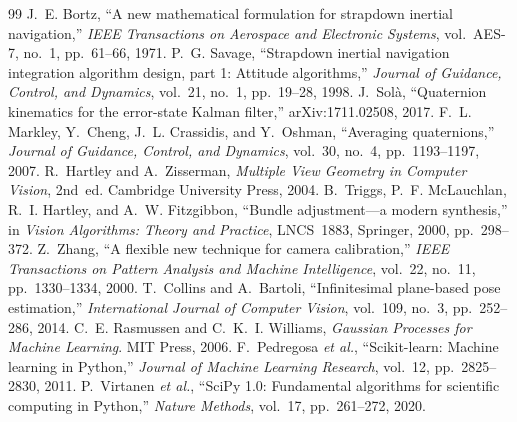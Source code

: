 \documentclass[11pt,a4paper]{article}
\begin{document}
\begin{thebibliography}{99}\small
{} J.~E. Bortz, ``A new mathematical formulation for strapdown inertial
navigation,'' \emph{IEEE Transactions on Aerospace and Electronic Systems}, vol.~AES-7, no.~1,
pp.~61--66, 1971.
 P.~G. Savage, ``Strapdown inertial navigation integration algorithm design,
part 1: Attitude algorithms,'' \emph{Journal of Guidance, Control, and Dynamics}, vol.~21, no.~1,
pp.~19--28, 1998.
 J.~Sol\`a, ``Quaternion kinematics for the error-state Kalman filter,''
arXiv:1711.02508, 2017.
 F.~L. Markley, Y.~Cheng, J.~L. Crassidis, and Y.~Oshman, ``Averaging
quaternions,'' \emph{Journal of Guidance, Control, and Dynamics}, vol.~30, no.~4, pp.~1193--1197,
2007.
 R.~Hartley and A.~Zisserman, \emph{Multiple View Geometry in Computer Vision},
2nd~ed. Cambridge University Press, 2004.
 B.~Triggs, P.~F. McLauchlan, R.~I. Hartley, and A.~W. Fitzgibbon, ``Bundle
adjustment---a modern synthesis,'' in \emph{Vision Algorithms: Theory and Practice}, LNCS~1883,
Springer, 2000, pp.~298--372.
 Z.~Zhang, ``A flexible new technique for camera calibration,'' \emph{IEEE
Transactions on Pattern Analysis and Machine Intelligence}, vol.~22, no.~11, pp.~1330--1334, 2000.
 T.~Collins and A.~Bartoli, ``Infinitesimal plane-based pose estimation,''
\emph{International Journal of Computer Vision}, vol.~109, no.~3, pp.~252--286, 2014.
 C.~E. Rasmussen and C.~K.~I. Williams, \emph{Gaussian Processes for Machine
Learning}. MIT Press, 2006.
 F.~Pedregosa \emph{et al.}, ``Scikit-learn: Machine learning in Python,''
\emph{Journal of Machine Learning Research}, vol.~12, pp.~2825--2830, 2011.
 P.~Virtanen \emph{et al.}, ``SciPy 1.0: Fundamental algorithms for scientific
computing in Python,'' \emph{Nature Methods}, vol.~17, pp.~261--272, 2020.
\end{thebibliography}
\end{document}
